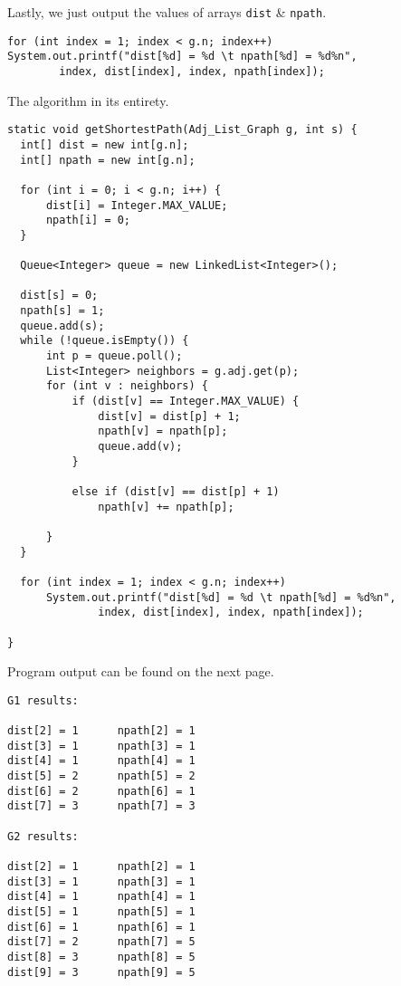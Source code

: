 \documentclass[11pt]{article}
\begin{document}
Lastly, we just output the values of arrays \verb|dist| \& \verb|npath|.
\begin{lstlisting}
for (int index = 1; index < g.n; index++)
System.out.printf("dist[%d] = %d \t npath[%d] = %d%n",
        index, dist[index], index, npath[index]);
\end{lstlisting}
\newpage
The algorithm in its entirety.
\begin{lstlisting}
static void getShortestPath(Adj_List_Graph g, int s) {
  int[] dist = new int[g.n];
  int[] npath = new int[g.n];

  for (int i = 0; i < g.n; i++) {
      dist[i] = Integer.MAX_VALUE;
      npath[i] = 0;
  }

  Queue<Integer> queue = new LinkedList<Integer>();

  dist[s] = 0;
  npath[s] = 1;
  queue.add(s);
  while (!queue.isEmpty()) {
      int p = queue.poll();
      List<Integer> neighbors = g.adj.get(p);
      for (int v : neighbors) {
          if (dist[v] == Integer.MAX_VALUE) {
              dist[v] = dist[p] + 1;
              npath[v] = npath[p];
              queue.add(v);
          }

          else if (dist[v] == dist[p] + 1)
              npath[v] += npath[p];

      }
  }

  for (int index = 1; index < g.n; index++)
      System.out.printf("dist[%d] = %d \t npath[%d] = %d%n",
              index, dist[index], index, npath[index]);

}
\end{lstlisting}

Program output can be found on the next page.
\newpage
\begin{lstlisting}
G1 results:

dist[2] = 1 	 npath[2] = 1
dist[3] = 1 	 npath[3] = 1
dist[4] = 1 	 npath[4] = 1
dist[5] = 2 	 npath[5] = 2
dist[6] = 2 	 npath[6] = 1
dist[7] = 3 	 npath[7] = 3

G2 results:

dist[2] = 1 	 npath[2] = 1
dist[3] = 1 	 npath[3] = 1
dist[4] = 1 	 npath[4] = 1
dist[5] = 1 	 npath[5] = 1
dist[6] = 1 	 npath[6] = 1
dist[7] = 2 	 npath[7] = 5
dist[8] = 3 	 npath[8] = 5
dist[9] = 3 	 npath[9] = 5
\end{lstlisting}
\end{document}
